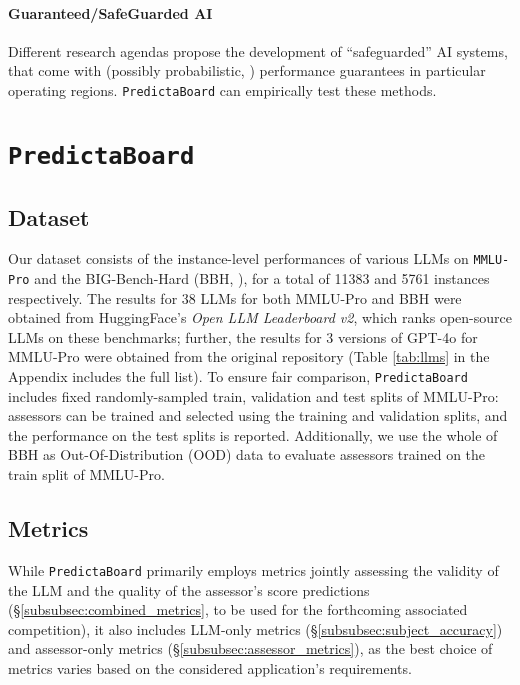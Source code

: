 \documentclass[11pt]{article}
\newcommand{\predbench}{{\tt PredictaBoard}\xspace}
\begin{document}
\paragraph{Guaranteed/SafeGuarded AI} Different research agendas \citep{dalrymple2024guaranteedsafeaiframework, darpa2024} propose the development of ``safeguarded'' AI systems, that come with (possibly probabilistic, \citealp{bengio2024bayesianoraclepreventharm}) performance guarantees in particular operating regions. \predbench can empirically test these methods.


 














\section{\predbench}
\label{sec:predbench}

\subsection{Dataset}
\label{subsec:dataset}

Our dataset consists of the instance-level performances of various LLMs on {\tt MMLU-Pro} \cite{wang2024mmluprorobustchallengingmultitask}  and the BIG-Bench-Hard (BBH, \citealp{suzgun2022challenging}), for a total of 11383 and 5761 instances respectively. The results for 38 LLMs for both  MMLU-Pro and BBH were obtained from HuggingFace's \textit{Open LLM Leaderboard v2}, which ranks open-source LLMs on these benchmarks; further, the results for 3 versions of GPT-4o for MMLU-Pro were obtained from the original repository (Table \ref{tab:llms} in the Appendix includes the full list).
To ensure fair comparison, \predbench includes fixed randomly-sampled train, validation and test splits %
of MMLU-Pro: assessors can be trained and selected using the training and validation splits, and the performance on the test splits is reported. Additionally, we use the whole of BBH as Out-Of-Distribution (OOD) data to evaluate assessors trained on the train split of MMLU-Pro.

\subsection{Metrics}
\label{subsec:metrics}
While \predbench %
primarily employs metrics jointly assessing the validity of the LLM and the quality of the assessor's score predictions (\S\ref{subsubsec:combined_metrics}, to be used for the forthcoming associated competition), it also includes LLM-only metrics (\S\ref{subsubsec:subject_accuracy}) and assessor-only metrics (\S\ref{subsubsec:assessor_metrics}), as the best choice of metrics varies based on the considered application's requirements. %
\end{document}
